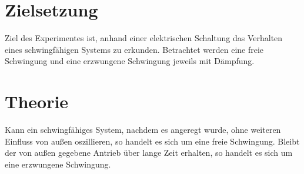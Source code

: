 \section{Zielsetzung}
Ziel des Experimentes ist, anhand einer elektrischen Schaltung das Verhalten eines schwingfähigen Systems zu erkunden. 
Betrachtet werden eine freie Schwingung und eine erzwungene Schwingung jeweils mit Dämpfung.

\section{Theorie}
\label{sec:Theorie}
Kann ein schwingfähiges System, nachdem es angeregt wurde, ohne weiteren Einfluss von außen oszillieren, so handelt es sich um eine freie Schwingung.
Bleibt der von außen gegebene Antrieb über lange Zeit erhalten, so handelt es sich um eine erzwungene Schwingung. \cite{kuchen}
